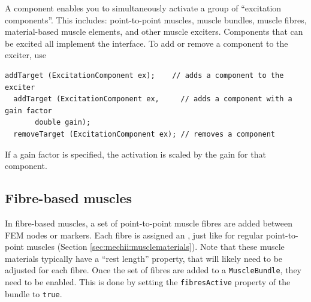 A  component enables you to simultaneously
activate a group of ``excitation components''.  This includes: point-to-point
muscles, muscle bundles, muscle fibres, material-based muscle elements, and
other muscle exciters.  Components that can be excited all implement the
interface.  To add or remove a component to the exciter, use
\begin{lstlisting}[]
  addTarget (ExcitationComponent ex);    // adds a component to the exciter
  addTarget (ExcitationComponent ex,     // adds a component with a gain factor
  	   double gain);   
  removeTarget (ExcitationComponent ex); // removes a component
\end{lstlisting}
If a gain factor is specified, the activation is scaled by the gain for that
component.

\subsection{Fibre-based muscles}
\label{sec:fem:fibremuscle}

In fibre-based muscles, a set of point-to-point muscle fibres are added between
FEM nodes or markers.  Each fibre is assigned an 
, just like for 
regular point-to-point muscles (Section \ref{sec:mechii:musclematerials}).  Note
that these muscle materials typically have a ``rest length'' property, that will
likely need to be adjusted for each fibre.  Once the set of fibres are added
to a {\tt MuscleBundle}, they need to be enabled.  This is done by setting
the {\tt fibresActive} property of the bundle to {\tt true}.

